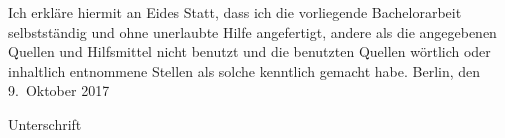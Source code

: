 
\vspace*{\fill}

Ich erkläre hiermit an Eides Statt, dass ich die vorliegende Bachelorarbeit selbstständig und ohne unerlaubte Hilfe angefertigt, andere als die angegebenen Quellen und Hilfsmittel nicht benutzt und die benutzten Quellen wörtlich oder inhaltlich entnommene Stellen als solche kenntlich gemacht habe. \newline \newline
Berlin, den 9.~Oktober 2017 \newline \newline
\hbox{} \dotfill \hspace{7.5cm} \hbox{} \newline
\hbox{} \begin{small}
Unterschrift
\end{small}
